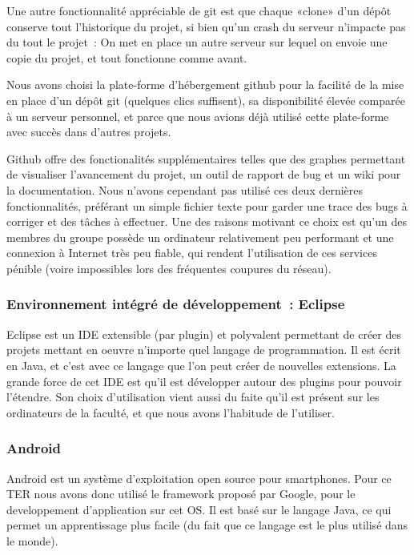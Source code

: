 \documentclass[a4paper,11pt,french]{article}
\def\android{Android\texttrademark{}}
\begin{document}
{Une autre fonctionnalité appréciable de git est que chaque «clone» d'un dépôt conserve tout l'historique du projet, si bien qu'un crash du serveur n'impacte pas du tout le projet~: On met en place un autre serveur sur lequel on envoie une copie du projet, et tout fonctionne comme avant.

Nous avons choisi la plate-forme d'hébergement github pour la facilité de la mise en place d'un dépôt git (quelques clics suffisent), sa disponibilité élevée comparée à un serveur personnel, et parce que nous avions déjà utilisé cette plate-forme avec succès dans d'autres projets.

Github offre des fonctionalités supplémentaires telles que des graphes permettant de visualiser l'avancement du projet, un outil de rapport de bug et un wiki pour la documentation. Nous n'avons cependant pas utilisé ces deux dernières fonctionnalités, préférant un simple fichier texte pour garder une trace des bugs à corriger et des tâches à effectuer. Une des raisons motivant ce choix est qu'un des membres du groupe possède un ordinateur relativement peu performant et une connexion à Internet très peu fiable, qui rendent l'utilisation de ces services pénible (voire impossibles lors des fréquentes coupures du réseau).

\subsubsection{Environnement intégré de développement~: Eclipse}
Eclipse est un IDE extensible (par plugin) et polyvalent permettant de créer des projets mettant en oeuvre n'importe quel langage de programmation. Il est écrit en Java, et c'est avec ce langage que l'on peut créer de nouvelles extensions. La grande force de cet IDE est qu'il est développer autour des plugins pour pouvoir l'étendre.
Son choix d'utilisation vient aussi du faite qu'il est présent sur les ordinateurs de la faculté, et que nous avons l'habitude de l'utiliser.

\subsubsection{\android{}}
\android{} est un système d'exploitation open source pour smartphones. Pour ce TER nous avons donc utilisé le framework proposé par Google, pour le developpement d'application sur cet OS. Il est basé sur le langage Java, ce qui permet un apprentissage plus facile (du fait que ce langage est le plus utilisé dans le monde).

}
\end{document}
